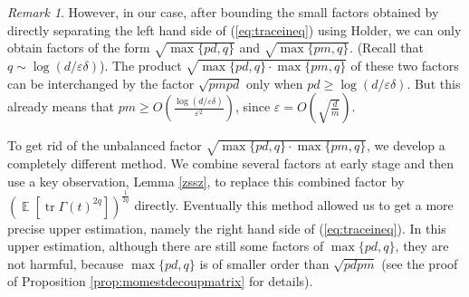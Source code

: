 \documentclass[11pt]{amsart}
\numberwithin{equation}{section}
\numberwithin{equation}{section}
\DeclareMathOperator{\E}{\mathbb{E}}
\DeclareMathOperator*{\tr}{tr}
\theoremstyle{remark}
\newtheorem{remark}[theorem]{Remark}
\theoremstyle{definition}
\begin{document}
\begin{remark}
However, in our case, after bounding the small factors obtained by directly separating the left hand side of (\ref{eq:traceineq}) using Holder, we can only obtain factors of the form $\sqrt{\max\{pd,q\}}$ and $\sqrt{\max\{pm,q\}}$. (Recall that $q \sim \log(d/\varepsilon\delta)$). The product $\sqrt{\max\{pd,q\} \cdot \max\{pm,q\}}$ of these two factors can be interchanged by the factor $\sqrt{pmpd}$ only when $pd \ge \log(d/\varepsilon\delta)$. But this already means that $pm \ge O(\frac{\log(d/\varepsilon\delta)}{\varepsilon^2})$, since $\varepsilon=O(\sqrt{\frac{d}{m}})$.

To get rid of the unbalanced factor $\sqrt{\max\{pd,q\} \cdot \max\{pm,q\}}$, we develop a completely different method. We combine several factors at early stage and then use a key observation, Lemma \ref{zssz}, to replace this combined factor by $(\E[\tr \Gamma(t)^{2q}])^{\frac{1}{2q}}$ directly. Eventually this method allowed us to get a more precise upper estimation, namely the right hand side of (\ref{eq:traceineq}). In this upper estimation, although there are still some factors of $\max\{pd,q\}$, they are not harmful, because $\max\{pd,q\}$ is of smaller order than $\sqrt{pdpm}$ (see the proof of Proposition \ref{prop:momestdecoupmatrix} for details). 




\end{remark}
\end{document}
